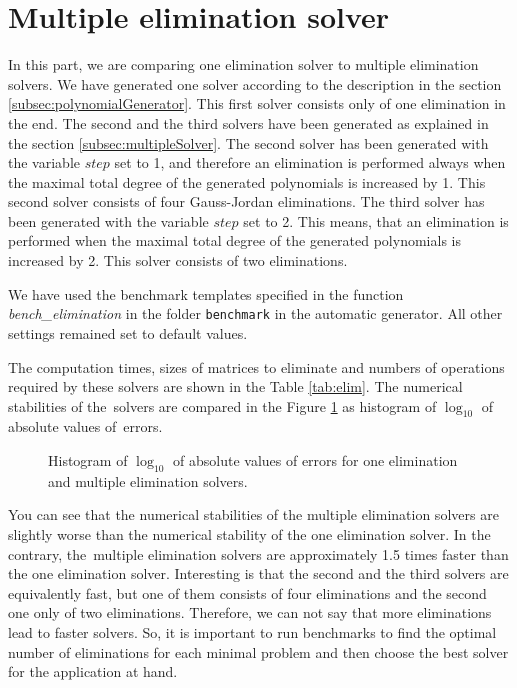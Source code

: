 \section{Multiple elimination solver}
\label{exp:elim}
In this part, we are comparing one elimination solver to multiple elimination solvers. We have generated one solver according to the description in the section \ref{subsec:polynomialGenerator}. This first solver consists only of one elimination in the end. The second and the third solvers have been generated as explained in the section \ref{subsec:multipleSolver}. The second solver has been generated with the variable $step$ set to 1, and therefore an elimination is performed always when the maximal total degree of the generated polynomials is increased by 1. This second solver consists of four Gauss-Jordan eliminations. The third solver has been generated with the variable $step$ set to 2. This means, that an elimination is performed when the maximal total degree of the generated polynomials is increased by 2. This solver consists of two eliminations.

We have used the benchmark templates specified in the function \textit{bench\_elimination} in the folder \texttt{benchmark} in the automatic generator. All other settings remained set to default values.

The computation times, sizes of matrices to eliminate and numbers of operations required by these solvers are shown in the Table \ref{tab:elim}. The numerical stabilities of the~solvers are compared in the Figure \ref{graph:elim} as histogram of $\log_{10}$ of absolute values of~errors.

\begin{figure}[ht]
  \centering
  \resizebox{0.95\textwidth}{!}{}
  \caption{Histogram of $\log_{10}$ of absolute values of errors for one elimination and multiple elimination solvers.}
  \label{graph:elim}
\end{figure}

You can see that the numerical stabilities of the multiple elimination solvers are slightly worse than the numerical stability of the one elimination solver. In the contrary, the~multiple elimination solvers are approximately 1.5 times faster than the one elimination solver. Interesting is that the second and the third solvers are equivalently fast, but one of them consists of four eliminations and the second one only of two eliminations. Therefore, we can not say that more eliminations lead to faster solvers. So, it is important to run benchmarks to find the optimal number of eliminations for each minimal problem and then choose the best solver for the application at hand.

